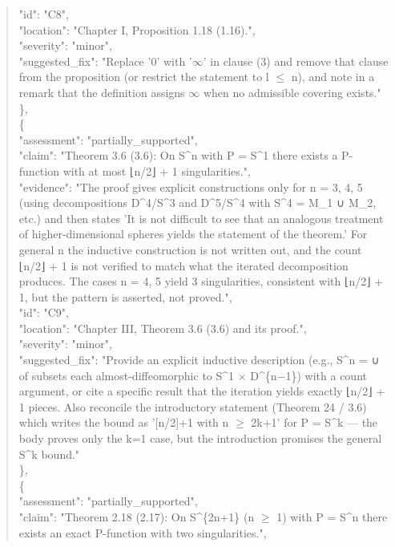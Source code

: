 \documentclass[11pt]{article}
\begin{document}
\begin{quote}
      "id": "C8",\\
      "location": "Chapter I, Proposition 1.18 (1.16).",\\
      "severity": "minor",\\
      "suggested\_fix": "Replace '0' with '\ensuremath{\infty}' in clause (3) and remove that clause from the proposition (or restrict the statement to l \ensuremath{\le} n), and note in a remark that the definition assigns \ensuremath{\infty} when no admissible covering exists."\\
    \},\\
    \{\\
      "assessment": "partially\_supported",\\
      "claim": "Theorem 3.6 (3.6): On S\^{}n with P = S\^{}1 there exists a P-function with at most ⌊n/2⌋ + 1 singularities.",\\
      "evidence": "The proof gives explicit constructions only for n = 3, 4, 5 (using decompositions D\^{}4/S\^{}3 and D\^{}5/S\^{}4 with S\^{}4 = M\_1 ∪ M\_2, etc.) and then states 'It is not difficult to see that an analogous treatment of higher-dimensional spheres yields the statement of the theorem.' For general n the inductive construction is not written out, and the count ⌊n/2⌋ + 1 is not verified to match what the iterated decomposition produces. The cases n = 4, 5 yield 3 singularities, consistent with ⌊n/2⌋ + 1, but the pattern is asserted, not proved.",\\
      "id": "C9",\\
      "location": "Chapter III, Theorem 3.6 (3.6) and its proof.",\\
      "severity": "minor",\\
      "suggested\_fix": "Provide an explicit inductive description (e.g., S\^{}n = ∪ of subsets each almost-diffeomorphic to S\^{}1 \ensuremath{\times} D\^{}\{n\ensuremath{-}1\}) with a count argument, or cite a specific result that the iteration yields exactly ⌊n/2⌋ + 1 pieces. Also reconcile the introductory statement (Theorem 24 / 3.6) which writes the bound as '[n/2]+1 with n \ensuremath{\ge} 2k+1' for P = S\^{}k --- the body proves only the k=1 case, but the introduction promises the general S\^{}k bound."\\
    \},\\
    \{\\
      "assessment": "partially\_supported",\\
      "claim": "Theorem 2.18 (2.17): On S\^{}\{2n+1\} (n \ensuremath{\ge} 1) with P = S\^{}n there exists an exact P-function with two singularities.",\\

\end{quote}
\end{document}
